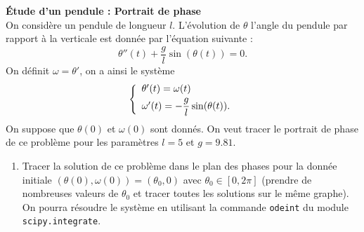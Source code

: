 \documentclass[12pt]{article}
\begin{document}
\begin{exo}\textbf{\'Etude d'un pendule : Portrait de phase}
  \label{ex:pendule}
  \\
  On consid\`ere un pendule de longueur $l$. L'\'evolution de $\theta$ l'angle du pendule par rapport \`a la verticale est donn\'ee par l'\'equation suivante :
$$
\theta''(t)+\frac{g}{l}\sin(\theta(t))=0.
$$
On d\'efinit $\omega=\theta'$, on a ainsi le syst\`eme 
\begin{equation*}
\left\{
\begin{array}{l}
\theta'(t)=\omega(t) \vspace{0.1cm}\\
\omega'(t)=-\displaystyle\frac{g}{l}\sin(\theta(t)).
\end{array}
\right.
\end{equation*}
On suppose que $\theta(0)$ et  $\omega(0)$ sont donn\'es. 
On veut tracer le portrait de phase de ce probl\`eme pour les param\`etres
$l=5$ et $g=9.81$.

\begin{enumerate}
\item Tracer la solution de ce probl\`eme dans le plan des phases pour la donn\'ee initiale
  $(\theta(0),\omega(0)) = (\theta_0,0)$ avec $\theta_0 \in [0 , 2\pi]$
  (prendre de nombreuses valeurs de $\theta_0$ et tracer toutes les solutions sur le m\^eme graphe).
  On pourra r\'esoudre le syst\`eme en utilisant la commande \texttt{odeint} du module \texttt{scipy.integrate}. \\


\end{enumerate}
\end{exo}
\end{document}
